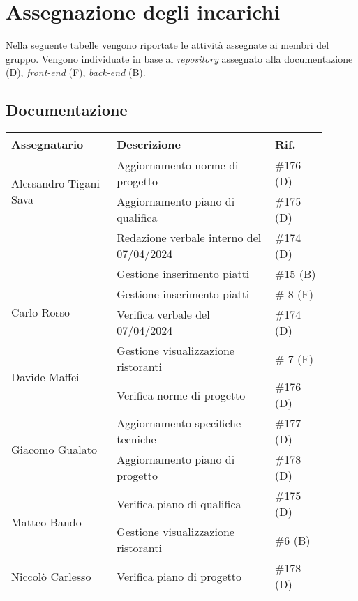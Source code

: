 \section{Assegnazione degli incarichi}
Nella seguente tabelle vengono riportate le attività assegnate ai membri del gruppo.
Vengono individuate in base al \textit{repository} assegnato alla documentazione (D), \textit{front-end} (F), \textit{back-end} (B).

\subsection{Documentazione}
\begin{center}
	{
		\renewcommand{\arraystretch}{1.5}
		\begin{tabular}{p{0.30\linewidth}|p{0.45\linewidth}|p{0.15\linewidth}}
			\textbf{Assegnatario}          			& \textbf{Descrizione}				& \textbf{Rif.} \\
			\hline
			\multirow{2}{*}{Alessandro Tigani Sava}	& Aggiornamento norme di progetto	& \#176 (D)	\\
			\cline{2-3}
													& Aggiornamento piano di qualifica	& \#175	(D)	\\
			\cline{2-3}
													& Redazione verbale interno del 07/04/2024	& \#174	(D)	\\
			\cline{2-3}
													& Gestione inserimento piatti		& \#15 (B)	\\
			\hline
			\multirow{2}{*}{Carlo Rosso}   			& Gestione inserimento piatti		& \# 8 (F)	\\
			\cline{2-3}
			                               			& Verifica verbale del 07/04/2024	& \#174	(D)	\\
			\hline
			\multirow{2}{*}{Davide Maffei} 			& Gestione visualizzazione ristoranti	& \# 7 (F)	\\
			\cline{2-3}
			                               			& Verifica norme di progetto		& \#176 (D)	\\
			\hline
			\multirow{2}{*}{Giacomo Gualato}		& Aggiornamento specifiche tecniche	& \#177 (D)	\\
			\cline{2-3}
			                               			& Aggiornamento piano di progetto	& \#178 (D)	\\
			\hline
			\multirow{2}{*}{Matteo Bando}  			& Verifica piano di qualifica		& \#175	(D)	\\
			\cline{2-3}
			                               			& Gestione visualizzazione ristoranti	& \#6 (B)	\\
			\hline
			Niccolò Carlesso               			& Verifica piano di progetto		& \#178 (D)	\\
			\hline
		\end{tabular}
	}
\end{center}
